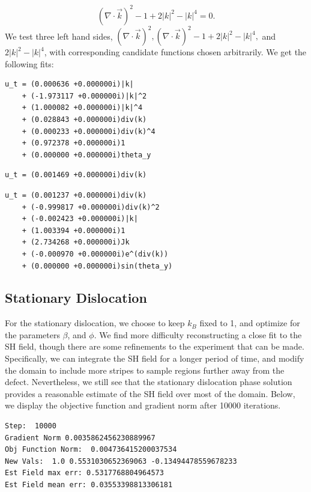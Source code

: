 \documentclass[12pt]{article}
\numberwithin{equation}{section}
\begin{document}
\begin{equation}
    (\nabla \cdot \vec{k})^2 -1 + 2|k|^2 - |k|^4 = 0.
\end{equation}
We test three left hand sides, $(\nabla \cdot \vec{k})^2, (\nabla \cdot \vec{k})^2 -1 + 2|k|^2 - |k|^4, $ and $2|k|^2 - |k|^4$, with corresponding candidate functions chosen arbitrarily.
We get the following fits:
\begin{verbatim}
u_t = (0.000636 +0.000000i)|k|
    + (-1.973117 +0.000000i)|k|^2
    + (1.000082 +0.000000i)|k|^4
    + (0.028843 +0.000000i)div(k)
    + (0.000233 +0.000000i)div(k)^4
    + (0.972378 +0.000000i)1
    + (0.000000 +0.000000i)theta_y
\end{verbatim}

\begin{verbatim}
u_t = (0.001469 +0.000000i)div(k)
\end{verbatim}

\begin{verbatim}
u_t = (0.001237 +0.000000i)div(k)
    + (-0.999817 +0.000000i)div(k)^2
    + (-0.002423 +0.000000i)|k|
    + (1.003394 +0.000000i)1
    + (2.734268 +0.000000i)Jk
    + (-0.000970 +0.000000i)e^(div(k))
    + (0.000000 +0.000000i)sin(theta_y)
\end{verbatim}

\FloatBarrier


\subsection{Stationary Dislocation}
\par For the stationary dislocation, we choose to keep $k_{B}$ fixed to 1, and optimize for the parameters $\beta$, and $\phi$. We find more difficulty reconstructing a close fit to the SH field, though there are some refinements to the experiment that can be made. Specifically, we can integrate the SH field for a longer period of time, and modify the domain to include more stripes to sample regions further away from the defect. Nevertheless, we still see that the stationary dislocation phase solution provides a reasonable estimate of the SH field over most of the domain. Below, we display the objective function and gradient norm after 10000 iterations.
\begin{verbatim}
Step:  10000
Gradient Norm 0.0035862456230889967
Obj Function Norm:  0.004736415200037534
New Vals:  1.0 0.5531030652369063 -0.13494478559678233
Est Field max err: 0.5317768804964573
Est Field mean err: 0.03553398813306181
\end{verbatim}
\end{document}
